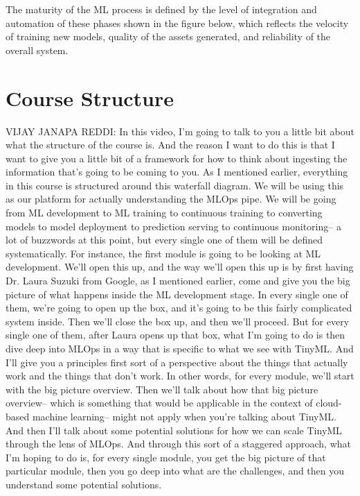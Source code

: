 The maturity of the ML process is defined by the level of integration and automation of these phases shown in the figure below, which reflects the velocity of training new models, quality of the assets generated, and reliability of the overall system.

\section{Course Structure}

VIJAY JANAPA REDDI: In this video, I'm going
to talk to you a little bit about what the structure of the course is.
And the reason I want to do this is that I
want to give you a little bit of a framework for how
to think about ingesting the information that's going to be coming to you.
As I mentioned earlier, everything in this course
is structured around this waterfall diagram.
We will be using this as our platform for actually understanding the MLOps
pipe.
We will be going from ML development to ML training to continuous training
to converting models to model deployment to prediction serving to continuous
monitoring-- a lot of buzzwords at this point, but every single one of them
will be defined systematically.
For instance, the first module is going to be looking at ML development.
We'll open this up, and the way we'll open this up
is by first having Dr. Laura Suzuki from Google,
as I mentioned earlier, come and give you
the big picture of what happens inside the ML development stage.
In every single one of them, we're going to open up the box,
and it's going to be this fairly complicated system inside.
Then we'll close the box up, and then we'll proceed.
But for every single one of them, after Laura opens up
that box, what I'm going to do is then dive deep into MLOps in a way
that is specific to what we see with TinyML.
And I'll give you a principles first sort
of a perspective about the things that actually work
and the things that don't work.
In other words, for every module, we'll start with the big picture overview.
Then we'll talk about how that big picture overview-- which
is something that would be applicable in the context of cloud-based machine
learning-- might not apply when you're talking about TinyML.
And then I'll talk about some potential solutions
for how we can scale TinyML through the lens of MLOps.
And through this sort of a staggered approach, what I'm hoping to do
is, for every single module, you get the big picture of that particular module,
then you go deep into what are the challenges,
and then you understand some potential solutions.
